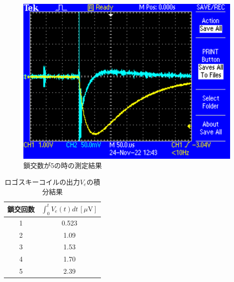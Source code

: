 \begin{figure}[H]
    \centering
    \includegraphics[scale=0.5]{rogowskii-5.pdf}
    \caption{鎖交数が5の時の測定結果}
\end{figure}

\begin{table}[!ht]
    \centering
    \caption{ロゴスキーコイルの出力$V_e$の積分結果}
    \begin{tabular}{c|c}
    \hline
        鎖交回数 & $\int_{0}^{t}V_e(t)dt\,[\si{\mu \volt}]$ \\ \hline
        1 & 0.523 \\ 
        2 & 1.09 \\ 
        3 & 1.53 \\ 
        4 & 1.70 \\ 
        5 & 2.39 \\ \hline
    \end{tabular}
\end{table}